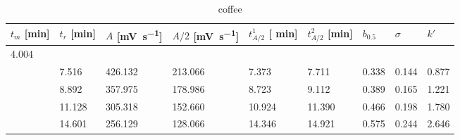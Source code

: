 \documentclass{article}
\begin{document}
 \begin{table}[ht!]
  \centering
 \begin{tabularx}{\textwidth}{XXXXXXXXX}
 $t_m $ [\si{\minute}] & $t_r$ [\si{\minute}] & $A$ [\si{\milli\volt\per\second}] & $A/2$ [\si{\milli\volt\per\second}] & $t_{A/2}^1$ [ \si{\minute}] & $t_{A/2}^2$  [\si{\minute}] &
 $b_{0.5}$ & $\sigma$ & $k'$\\
\hline
4.004 &  &&&&&&& \\
&7.516& 426.132 & 213.066  & 7.373 & 7.711&     0.338 & 0.144 & 0.877 \\
&8.892 & 357.975 & 178.986 & 8.723 & 9.112 &    0.389 & 0.165 & 1.221\\
&11.128 & 305.318 & 152.660 & 10.924 & 11.390 & 0.466 & 0.198 & 1.780 \\
&14.601&256.129&128.066    & 14.346 & 14.921 &  0.575 & 0.244 & 2.646 \\
\end{tabularx}
   \renewcommand\thetable{5}

  \caption{coffee}
\end{table}
\end{document}
